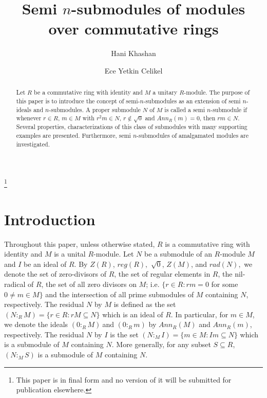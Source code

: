 \documentclass{amsart}%
\theoremstyle{plain}
\numberwithin{equation}{section}
\begin{document}
\title[Semi $n$-submodules]{Semi $n$-submodules of modules over commutative rings}
\author{Hani Khashan}
\address{Department of Mathematics, Faculty of Science, Al al-Bayt University, Al
Mafraq, Jordan.}
\author{Ece Yetkin Celikel}
\address{Department of Software Engineering, Faculty of Engineering, Hasan Kalyoncu
University, Gaziantep, Turkey.}
\thanks{This paper is in final form and no version of it will be submitted for
publication elsewhere.}

\begin{abstract}
Let $R$ be a commutative ring with identity and $M$ a unitary $R$-module. The
purpose of this paper is to introduce the concept of semi-$n$-submodules as an
extension of semi $n$-ideals and $n$-submodules. A proper submodule $N$ of $M$
is called a semi $n$-submodule if whenever $r\in R$, $m\in M$ with $r^{2}m\in
N$, $r\notin\sqrt{0}$ and $Ann_{R}(m)=0$, then $rm\in N$. Several properties,
characterizations of this class of submodules with many supporting examples
are presented. Furthermore, semi $n$-submodules of amalgamated modules are investigated.

\end{abstract}
\maketitle


\section{Introduction}

Throughout this paper, unless otherwise stated, $R$ is a commutative ring with
identity and $M$ is a unital $R$-module. Let $N$ be a submodule of an
$R$-module $M$ and $I$ be an ideal of $R$. By $Z(R)$, $reg(R),$ $\sqrt{0}$,
$Z(M)$, and $rad(N),$ we denote the set of zero-divisors of $R$, the set of
regular elements in $R$, the nil-radical of $R$, the set of all zero divisors
on $M$; i.e. $\{r\in R:rm=0$ for some $0\neq m\in M\}$ and the intersection of
all prime submodules of $M$ containing $N$, respectively. The residual $N$ by
$M$ is defined as the set $(N:_{R}M)=\{r\in R:rM\subseteq N\}$ which is an
ideal of $R$. In particular, for $m\in M$, we denote the ideals $(0:_{R}%
M)~$and $(0:_{R}m)$ by $Ann_{R}(M)$ and $Ann_{R}(m)$, respectively. The
residual $N$ by $I$ is the set $(N:_{M}I)=\{m\in M:Im\subseteq N\}$ which is a
submodule of $M$ containing $N$. More generally, for any subset $S\subseteq
R$, $(N:_{M}S)$ is a submodule of $M$ containing $N$.
\end{document}
